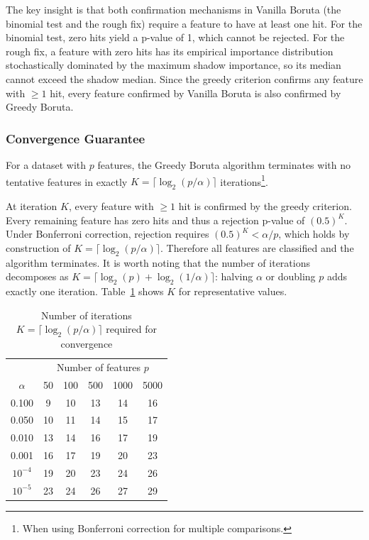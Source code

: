 \documentclass[runningheads]{llncs}
\begin{document}
The key insight is that both confirmation mechanisms in Vanilla Boruta (the binomial test and the rough fix) require a feature to have at least one hit. For the binomial test, zero hits yield a p-value of 1, which cannot be rejected. For the rough fix, a feature with zero hits has its empirical importance distribution stochastically dominated by the maximum shadow importance, so its median cannot exceed the shadow median. Since the greedy criterion confirms any feature with $\geq 1$ hit, every feature confirmed by Vanilla Boruta is also confirmed by Greedy Boruta.

\subsubsection{Convergence Guarantee}

\begin{theorem}
\label{thm:convergence}
For a dataset with $p$ features, the Greedy Boruta algorithm terminates with no tentative features in exactly $K = \lceil \log_2(p/\alpha) \rceil$ iterations\footnote{\label{fn:bonf}When using Bonferroni correction for multiple comparisons.}. 
\end{theorem}

At iteration $K$, every feature with $\geq 1$ hit is confirmed by the greedy criterion. Every remaining feature has zero hits and thus a rejection p-value of $(0.5)^K$. Under Bonferroni correction, rejection requires $(0.5)^K < \alpha/p$, which holds by construction of $K = \lceil \log_2(p/\alpha) \rceil$. Therefore all features are classified and the algorithm terminates. It is worth noting that the number of iterations decomposes as $K = \lceil \log_2(p) + \log_2(1/\alpha) \rceil$: halving $\alpha$ or doubling $p$ adds exactly one iteration. Table~\ref{tab:iterations_alpha} shows $K$ for representative values.

\begin{table}[h]
\centering
\caption{Number of iterations $K = \lceil \log_2(p/\alpha) \rceil$ required for convergence}
\label{tab:iterations_alpha}
\begin{tabular}{c|ccccc}
\toprule
& \multicolumn{5}{c}{Number of features $p$} \\
$\alpha$ & 50 & 100 & 500 & 1000 & 5000 \\
\midrule
0.100 & 9 & 10 & 13 & 14 & 16 \\
0.050 & 10 & 11 & 14 & 15 & 17 \\
0.010 & 13 & 14 & 16 & 17 & 19 \\
0.001 & 16 & 17 & 19 & 20 & 23 \\
$10^{-4}$ & 19 & 20 & 23 & 24 & 26 \\
$10^{-5}$ & 23 & 24 & 26 & 27 & 29 \\
\bottomrule
\end{tabular}
\end{table}
\end{document}
